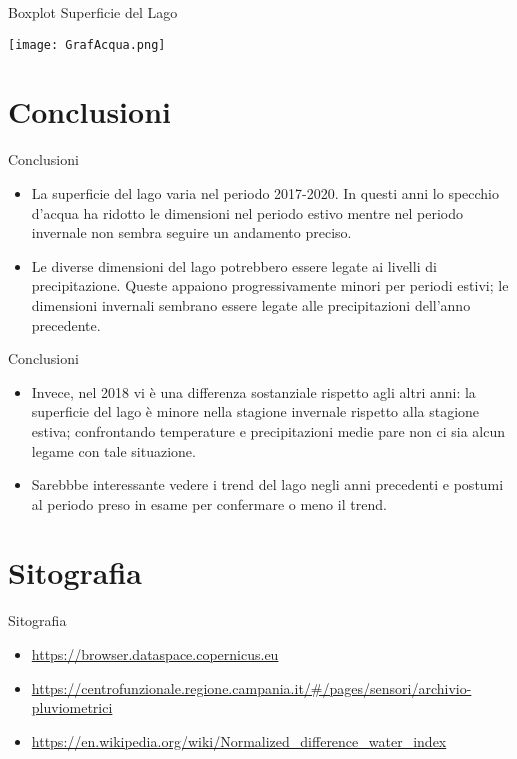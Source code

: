\documentclass{beamer} %
\begin{document}
        \begin{frame}{Boxplot Superficie del Lago}
            \begin{center}
                \texttt{[image: GrafAcqua.png]}
            \end{center}
        \end{frame}

\section{Conclusioni}

        \begin{frame}{Conclusioni}
            \begin{itemize}
                \item La superficie del lago varia nel periodo 2017-2020. In questi anni lo specchio d'acqua ha ridotto le dimensioni nel periodo estivo mentre nel periodo invernale non sembra seguire un andamento preciso. 
                \item Le diverse dimensioni del lago potrebbero essere legate ai livelli di precipitazione. Queste appaiono progressivamente minori per periodi estivi; le dimensioni invernali sembrano essere legate alle precipitazioni dell'anno precedente. 
            \end{itemize}
        \end{frame}

                \begin{frame}{Conclusioni}
            \begin{itemize}
                \item Invece, nel 2018 vi è una differenza sostanziale rispetto agli altri anni: la superficie del lago è minore nella stagione invernale rispetto alla stagione estiva; confrontando temperature e precipitazioni medie pare non ci sia alcun legame con tale situazione.
                \item Sarebbbe interessante vedere i trend del lago negli anni precedenti e postumi al periodo preso in esame per confermare o meno il trend. 
            \end{itemize}
        \end{frame}
        
\section{Sitografia}
        \begin{frame}{Sitografia}
            \begin{itemize}
                \item \url{https://browser.dataspace.copernicus.eu} \\
                \item \url{https://centrofunzionale.regione.campania.it/#/pages/sensori/archivio-pluviometrici} \\
                \item \url{https://en.wikipedia.org/wiki/Normalized_difference_water_index}\\
            \end{itemize}  
        \end{frame}
\end{document}
